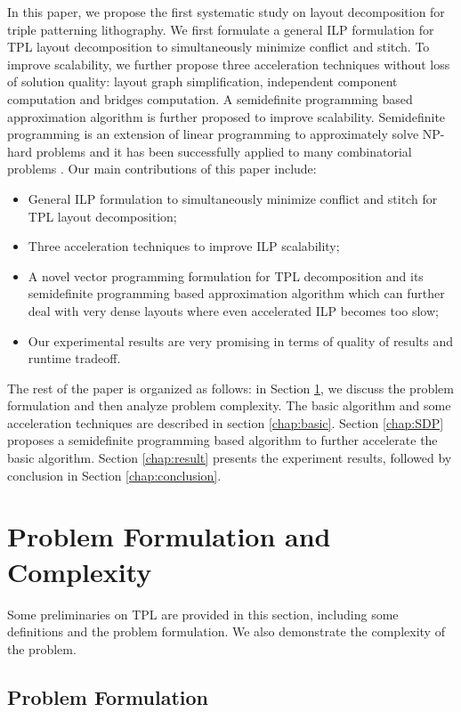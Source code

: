\documentclass[10pt,conference]{IEEEtran}
\begin{document}
In this paper, we propose the first systematic study on layout decomposition for triple patterning lithography.  We first formulate a general ILP formulation for TPL layout decomposition to simultaneously minimize conflict and stitch.
To improve scalability, we further propose three acceleration techniques without loss of solution quality:
layout graph simplification, independent component computation and bridges computation.
A semidefinite programming based approximation algorithm is further proposed to improve scalability.
Semidefinite programming is an extension of linear programming to approximately solve NP-hard problems and it has been successfully applied to many combinatorial problems \cite{SDP_1996Boyed}\cite{1998Karger}. 
Our main contributions of this paper include:
\begin{itemize}
    \item General ILP formulation to simultaneously minimize conflict and stitch for TPL layout decomposition;
    \item Three acceleration techniques to improve ILP scalability;
    \item A novel vector programming formulation for TPL decomposition and its semidefinite programming based approximation algorithm which can further deal with very dense layouts where even accelerated ILP becomes too slow;
    \item Our experimental results are very promising in terms of quality of results and runtime tradeoff. 
\end{itemize}

The rest of the paper is organized as follows:
in Section \ref{chap:problem}, we discuss the problem formulation and then analyze problem complexity.
The basic algorithm and some acceleration techniques are described in section \ref{chap:basic}.
Section \ref{chap:SDP} proposes a semidefinite programming based algorithm to further accelerate the basic algorithm.
Section \ref{chap:result} presents the experiment results, followed by conclusion in Section \ref{chap:conclusion}.
 \section{Problem Formulation and Complexity}
\label{chap:problem}

Some preliminaries on TPL are provided in this section, including some definitions and the problem formulation.
We also demonstrate the complexity of the problem.

\subsection{Problem Formulation}
\end{document}
